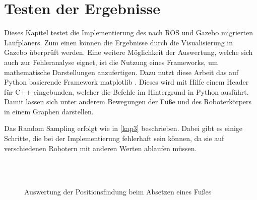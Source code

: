 \chapter{Testen der Ergebnisse}
\label{kap6}

Dieses Kapitel testet die Implementierung des nach \ac{ROS} und Gazebo migrierten Laufplaners. Zum einen können die Ergebnisse durch die Visualisierung in Gazebo überprüft werden. Eine weitere Möglichkeit der Auswertung, welche sich auch zur Fehleranalyse eignet, ist die Nutzung eines Frameworks, um mathematische Darstellungen anzufertigen. Dazu nutzt diese Arbeit das auf Python basierende Framework matplotlib \autocite{barrett2005matplotlib}. Dieses wird mit Hilfe einem Header für C++ eingebunden, welcher die Befehle im Hintergrund in Python ausführt. Damit lassen sich unter anderem Bewegungen der Füße und des Roboterkörpers in einem Graphen darstellen.

Das Random Sampling erfolgt wie in \autoref{kap3} beschrieben. Dabei gibt es einige Schritte, die bei der Implementierung fehlerhaft sein können, da sie auf verschiedenen Robotern mit anderen Werten ablaufen müssen. 

\begin{figure}[t!]
  \centering
  \begin{subfigure}[b]{.5\linewidth}
    \centering
    \resizebox{\linewidth}{!}{
      
    }
    \label{kap5:footDownNormal1}
  \end{subfigure}%
  \begin{subfigure}[b]{.5\linewidth}
    \centering
    \resizebox{\linewidth}{!}{
      
    }
    \label{kap5:footDownNormal2}
  \end{subfigure}\\
  \\[\smallskipamount]
  \begin{subfigure}[b]{.5\linewidth}
    \centering
    \resizebox{\linewidth}{!}{
      
    }
    \label{kap5:footDownSpiral1}
  \end{subfigure}%
  \begin{subfigure}[b]{.5\linewidth}
    \centering
    \resizebox{\linewidth}{!}{
      
    }
    \label{kap5:footDownSpiral2}
  \end{subfigure}%
  \caption{Auswertung der Positionsfindung beim Absetzen eines Fußes}
  \label{kap5:footDown}
\end{figure}

